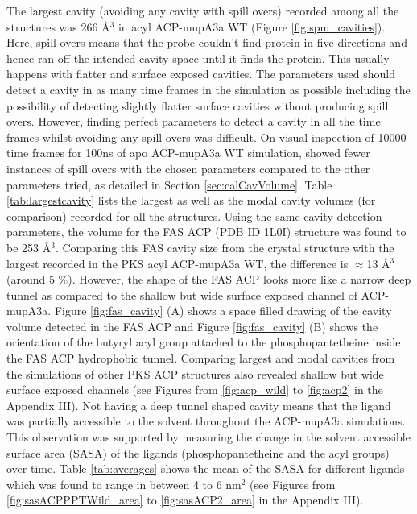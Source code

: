 	The largest cavity (avoiding any cavity with spill overs) recorded among all the structures was 266 \AA$ ^{3} $ in acyl ACP-mupA3a WT (Figure \ref{fig:spm_cavities}). Here, spill overs means that the probe couldn't find protein in five directions and hence ran off the intended cavity space until it finds the protein. This usually happens with flatter and surface exposed cavities. The parameters used should detect a cavity in as many time frames in the simulation as possible including the possibility of detecting slightly flatter surface  cavities without producing  spill overs. However, finding perfect parameters to detect a cavity in all the time frames whilst avoiding any spill overs was difficult. On visual inspection of 10000 time frames for 100ns of apo ACP-mupA3a WT simulation, showed fewer instances of spill overs with the chosen parameters compared to the other parameters tried, as detailed in Section \ref{sec:calCavVolume}. Table \ref{tab:largestcavity} lists the largest as well as the modal cavity volumes (for comparison) recorded for all the structures. Using the same cavity detection parameters, the volume for the FAS ACP (PDB ID 1L0I) structure was found to be 253 \AA$ ^{3} $. Comparing this FAS cavity size from the crystal structure with the largest recorded in the PKS acyl ACP-mupA3a WT, the difference is $ \approx $13 \AA$ ^{3} $ (around 5 \%). However, the shape of the FAS ACP looks more like a narrow deep tunnel as compared to the shallow but wide surface exposed channel of ACP-mupA3a. Figure \ref{fig:fas_cavity} (A) shows a space filled drawing of the cavity volume detected in the FAS ACP and Figure \ref{fig:fas_cavity} (B) shows the orientation of the butyryl acyl group attached to the phosphopantetheine inside the FAS ACP hydrophobic tunnel. Comparing largest and modal cavities from the simulations of other PKS ACP structures also revealed shallow but wide surface exposed channels (see Figures from \ref{fig:acp_wild} to \ref{fig:acp2} in the Appendix III). Not having a deep tunnel shaped cavity means that the ligand was partially accessible to the solvent throughout the ACP-mupA3a simulations. This observation was supported by measuring the change in the solvent accessible surface area (SASA) of the ligands (phosphopantetheine and the acyl groups) over time. Table \ref{tab:averages} shows the mean of the SASA for different ligands which was found to range in between 4 to 6 nm$ ^{2} $ (see Figures from \ref{fig:sasACPPPTWild_area} to \ref{fig:sasACP2_area} in the Appendix III).  
	
